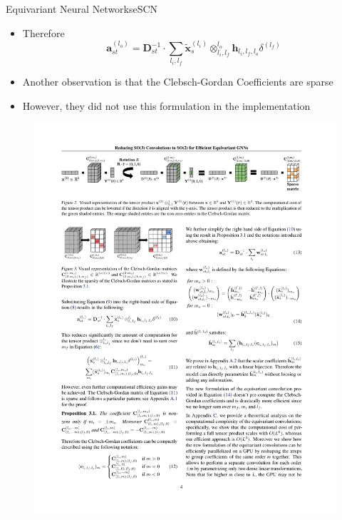\documentclass[pdf,serif]{beamer}
\begin{document}
\begin{frame}{Equivariant Neural Networks}{eSCN}
    \begin{itemize}
        \item Therefore
        $$
        \mathbf{a}_{s t}^{\left(l_o\right)}=\mathbf{D}_{s t}^{-1} \cdot \sum_{l_i, l_f} \tilde{\mathbf{x}}_s^{\left(l_i\right)} \otimes_{l_i, l_f}^{l_o} \mathbf{h}_{l_i, l_f, l_o} \delta^{\left(l_f\right)}
        $$
        \item Another observation is that the Clebsch-Gordan Coefficients are sparse
        \item However, they did not use this formulation in the implementation
    \end{itemize}
    \vspace*{1em}
    \begin{figure}
        \includegraphics[width=\linewidth]{images/escn}
    \end{figure}
\end{frame}
\end{document}

